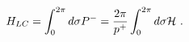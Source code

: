 \begin{equation}
H_{LC}
 = \int^{2\pi}_0 d \sigma P^-
 = \frac{2 \pi}{p^+} \int^{2\pi}_0 d \sigma {\cal H} ~.
\label{lc-ham}
\end{equation}

